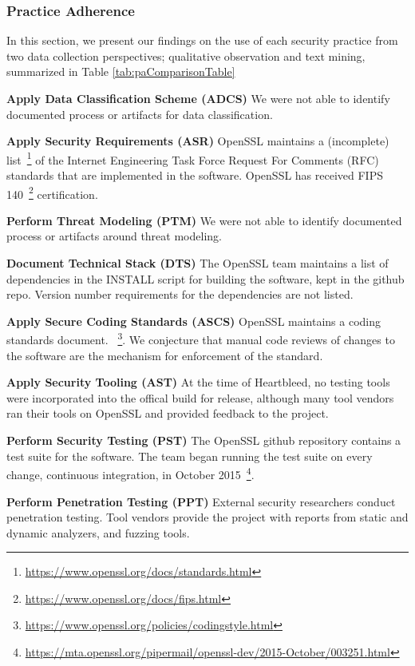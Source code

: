 \subsubsection{Practice Adherence}
In this section, we present our findings on the use of each security practice from two data collection perspectives; qualitative observation and text mining, summarized in Table \ref{tab:paComparisonTable}

\textbf{Apply Data Classification Scheme (ADCS)}
We were not able to identify documented process or artifacts for data classification.

\textbf{Apply Security Requirements (ASR)}
OpenSSL maintains a (incomplete) list~\footnote{\url{https://www.openssl.org/docs/standards.html}} of the Internet Engineering Task Force Request For Comments (RFC) standards that are implemented in the software.  OpenSSL has received FIPS 140~\footnote{\url{https://www.openssl.org/docs/fips.html}} certification.

\textbf{Perform Threat Modeling (PTM)}
We were not able to identify documented process or artifacts around threat modeling.

\textbf{Document Technical Stack (DTS)}
The OpenSSL team maintains a list of dependencies in the INSTALL script for building the software, kept in the github repo. Version number requirements for the dependencies are not listed.

\textbf{Apply Secure Coding Standards (ASCS)}
OpenSSL maintains a coding standards document. ~\footnote{\url{https://www.openssl.org/policies/codingstyle.html}}. We conjecture that manual code reviews of changes to the software are the mechanism for enforcement of the standard.

\textbf{Apply Security Tooling (AST)}
At the time of Heartbleed, no testing tools were incorporated into the offical build for release, although many tool vendors ran their tools on OpenSSL and provided feedback to the project. 

\textbf{Perform Security Testing (PST)}
The OpenSSL github repository contains a test suite for the software. The team began running the test suite on every change, continuous integration, in October 2015~\footnote{\url{https://mta.openssl.org/pipermail/openssl-dev/2015-October/003251.html}}.

\textbf{Perform Penetration Testing (PPT)}
External security researchers conduct penetration testing. Tool vendors provide the project with reports from static and dynamic analyzers, and fuzzing tools. 


